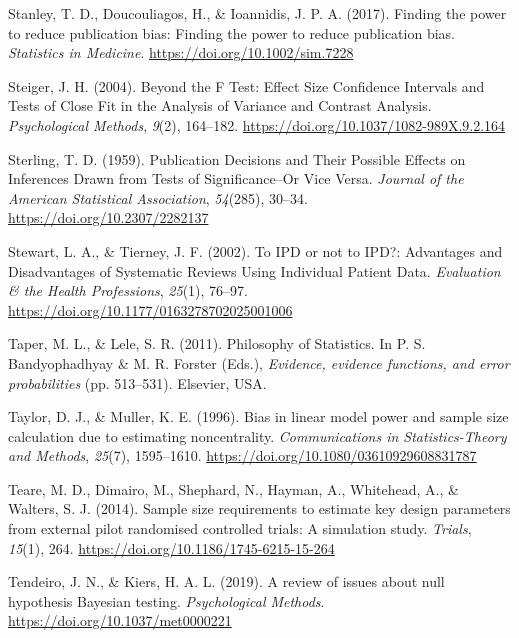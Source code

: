 \documentclass[
  oneside]{krantz}
\newlength{\cslhangindent}
\newlength{\cslentryspacingunit} %
\newenvironment{CSLReferences}[2] %
 {%
  \setlength{\parindent}{0pt}
  \ifodd #1
  \let\oldpar\par
  \def\par{\hangindent=\cslhangindent\oldpar}
  \fi
  \setlength{\parskip}{#2\cslentryspacingunit}
 }%
 {}
\begin{document}
\begin{CSLReferences}{1}{0}
\leavevmode{}%
Stanley, T. D., Doucouliagos, H., \& Ioannidis, J. P. A. (2017). Finding
the power to reduce publication bias: {Finding} the power to reduce
publication bias. \emph{Statistics in Medicine}.
\url{https://doi.org/10.1002/sim.7228}

\leavevmode{}%
Steiger, J. H. (2004). Beyond the {F Test}: {Effect Size Confidence
Intervals} and {Tests} of {Close Fit} in the {Analysis} of {Variance}
and {Contrast Analysis}. \emph{Psychological Methods}, \emph{9}(2),
164--182. \url{https://doi.org/10.1037/1082-989X.9.2.164}

\leavevmode{}%
Sterling, T. D. (1959). Publication {Decisions} and {Their Possible
Effects} on {Inferences Drawn} from {Tests} of {Significance--Or Vice
Versa}. \emph{Journal of the American Statistical Association},
\emph{54}(285), 30--34. \url{https://doi.org/10.2307/2282137}

\leavevmode{}%
Stewart, L. A., \& Tierney, J. F. (2002). To {IPD} or not to {IPD}?:
{Advantages} and {Disadvantages} of {Systematic Reviews Using Individual
Patient Data}. \emph{Evaluation \& the Health Professions},
\emph{25}(1), 76--97. \url{https://doi.org/10.1177/0163278702025001006}

\leavevmode{}%
Taper, M. L., \& Lele, S. R. (2011). Philosophy of {Statistics}. In P.
S. Bandyophadhyay \& M. R. Forster (Eds.), \emph{Evidence, evidence
functions, and error probabilities} (pp. 513--531). {Elsevier, USA}.

\leavevmode{}%
Taylor, D. J., \& Muller, K. E. (1996). Bias in linear model power and
sample size calculation due to estimating noncentrality.
\emph{Communications in Statistics-Theory and Methods}, \emph{25}(7),
1595--1610. \url{https://doi.org/10.1080/03610929608831787}

\leavevmode{}%
Teare, M. D., Dimairo, M., Shephard, N., Hayman, A., Whitehead, A., \&
Walters, S. J. (2014). Sample size requirements to estimate key design
parameters from external pilot randomised controlled trials: A
simulation study. \emph{Trials}, \emph{15}(1), 264.
\url{https://doi.org/10.1186/1745-6215-15-264}

\leavevmode{}%
Tendeiro, J. N., \& Kiers, H. A. L. (2019). A review of issues about
null hypothesis {Bayesian} testing. \emph{Psychological Methods}.
\url{https://doi.org/10.1037/met0000221}


\end{CSLReferences}
\end{document}
